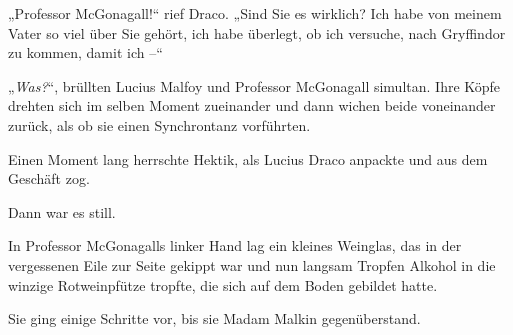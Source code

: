 „Professor McGonagall!“ rief Draco.
„Sind Sie es wirklich? Ich habe von meinem Vater so viel über Sie gehört, ich habe überlegt, ob ich versuche, nach Gryffindor zu kommen, damit ich –“

„\emph{Was?}“, brüllten Lucius Malfoy und Professor McGonagall simultan. Ihre Köpfe drehten sich im selben Moment zueinander und dann wichen beide voneinander zurück, als ob sie einen Synchrontanz vorführten.

Einen Moment lang herrschte Hektik, als Lucius Draco anpackte und aus dem Geschäft zog.

Dann war es still.

In Professor McGonagalls linker Hand lag ein kleines Weinglas, das in der vergessenen Eile zur Seite gekippt war und nun langsam Tropfen Alkohol in die winzige Rotweinpfütze tropfte, die sich auf dem Boden gebildet hatte.

Sie ging einige Schritte vor, bis sie Madam Malkin gegenüberstand.

